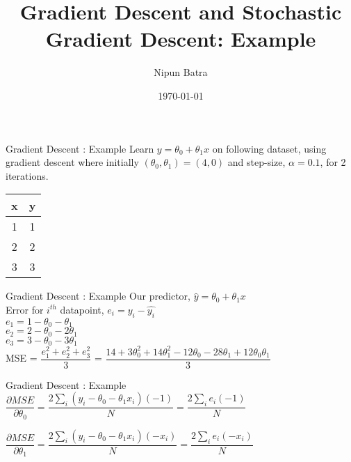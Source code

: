 \documentclass{beamer}
\title{Gradient Descent and Stochastic Gradient Descent: Example}
\date{\today}
\author{Nipun Batra}
\institute{IIT Gandhinagar}
\begin{document}
	\maketitle

	\begin{frame}{Gradient Descent : Example}
		Learn $y = \theta_0 + \theta_1 x$ on following dataset, using gradient descent where initially $(\theta_0, \theta_1) = (4,0)$ and step-size, $\alpha  = 0.1$, for 2 iterations. 
		\begin{table}[]
		\centering
		\label{tab:my-table}
		\begin{tabular}{|c|c|}
		\hline
		\textbf{x} & \textbf{y} \\ \hline
		1 & 1 \\ \hline
		2 & 2 \\ \hline
		3 & 3 \\ \hline
		\end{tabular}
		\end{table}
	\end{frame}

	\begin{frame}{Gradient Descent : Example}
		Our predictor, $\hat{y} = \theta_0 + \theta_1x$\\
		\vspace{1cm}
		Error for $i^{th}$ datapoint, $e_i = y_i - \hat{y_i}$\\
		$e_1 = 1 - \theta_0 - \theta_1$ \\
		$e_2 = 2 - \theta_0 - 2\theta_1$ \\
		$e_3 = 3 - \theta_0 - 3\theta_1$ \\
		
		\vspace{1cm}
		MSE = $\dfrac{e_1^2 + e_2^2 + e_3^2}{3}$ = $\dfrac{14 + 3\theta_0^2 + 14\theta_1^2 -12\theta_0 - 28\theta_1 + 12\theta_0\theta_1}{3}$\\
	\end{frame}
	

	\begin{frame}{Gradient Descent : Example}
		$\dfrac{\partial MSE}{\partial \theta_0} = \dfrac{2\sum\limits_i \left( y_i - \theta_0 -\theta_1x_i \right)\left(-1\right)}{N} = \dfrac{2\sum\limits_i e_i\left(-1\right)}{N}$  
	
		\vspace{2cm}
		$\dfrac{\partial MSE}{\partial \theta_1} = \dfrac{2\sum\limits_i \left( y_i - \theta_0 -\theta_1x_i \right)\left(-x_i\right)}{N} = \dfrac{2\sum\limits_i e_i\left(-x_i\right)}{N}$ 
	\end{frame}
	
\end{document}
